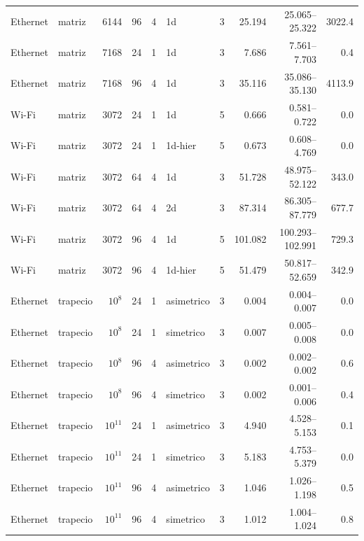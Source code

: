 \begin{longtable}{llrrrlrrrr}
Ethernet & matriz & 6144 & 96 & 4 & 1d & 3 & 25.194 & 25.065--25.322 & 3022.4 \\
Ethernet & matriz & 7168 & 24 & 1 & 1d & 3 & 7.686 & 7.561--7.703 & 0.4 \\
Ethernet & matriz & 7168 & 96 & 4 & 1d & 3 & 35.116 & 35.086--35.130 & 4113.9 \\
Wi-Fi & matriz & 3072 & 24 & 1 & 1d & 5 & 0.666 & 0.581--0.722 & 0.0 \\
Wi-Fi & matriz & 3072 & 24 & 1 & 1d-hier & 5 & 0.673 & 0.608--4.769 & 0.0 \\
Wi-Fi & matriz & 3072 & 64 & 4 & 1d & 3 & 51.728 & 48.975--52.122 & 343.0 \\
Wi-Fi & matriz & 3072 & 64 & 4 & 2d & 3 & 87.314 & 86.305--87.779 & 677.7 \\
Wi-Fi & matriz & 3072 & 96 & 4 & 1d & 5 & 101.082 & 100.293--102.991 & 729.3 \\
Wi-Fi & matriz & 3072 & 96 & 4 & 1d-hier & 5 & 51.479 & 50.817--52.659 & 342.9 \\
Ethernet & trapecio & $10^{8}$ & 24 & 1 & asimetrico & 3 & 0.004 & 0.004--0.007 & 0.0 \\
Ethernet & trapecio & $10^{8}$ & 24 & 1 & simetrico & 3 & 0.007 & 0.005--0.008 & 0.0 \\
Ethernet & trapecio & $10^{8}$ & 96 & 4 & asimetrico & 3 & 0.002 & 0.002--0.002 & 0.6 \\
Ethernet & trapecio & $10^{8}$ & 96 & 4 & simetrico & 3 & 0.002 & 0.001--0.006 & 0.4 \\
Ethernet & trapecio & $10^{11}$ & 24 & 1 & asimetrico & 3 & 4.940 & 4.528--5.153 & 0.1 \\
Ethernet & trapecio & $10^{11}$ & 24 & 1 & simetrico & 3 & 5.183 & 4.753--5.379 & 0.0 \\
Ethernet & trapecio & $10^{11}$ & 96 & 4 & asimetrico & 3 & 1.046 & 1.026--1.198 & 0.5 \\
Ethernet & trapecio & $10^{11}$ & 96 & 4 & simetrico & 3 & 1.012 & 1.004--1.024 & 0.8 \\
\bottomrule\end{longtable}
